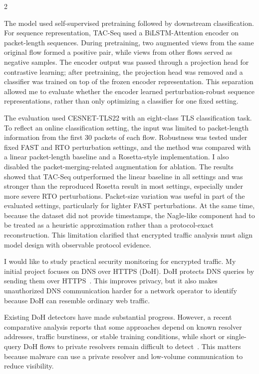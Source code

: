 \documentclass[a4paper,11pt]{article}
\newcommand{\majorsection}[1]{%
  \vspace{2pt}\noindent{\large\bfseries\color{DeepBlue} #1}\par\vspace{1pt}}
\newcommand{\subsectionrunin}[1]{%
  \vspace{1pt}\noindent{\bfseries\color{DeepBlue} #1}\par\nobreak\vspace{0pt}}
\begin{document}
\begin{multicols}{2}

The model used self-supervised pretraining followed by downstream
classification. For sequence representation, TAC-Seq used a BiLSTM-Attention
encoder on packet-length sequences. During pretraining, two augmented views
from the same original flow formed a positive pair, while views from other
flows served as negative samples. The encoder output was passed through a
projection head for contrastive learning; after
pretraining, the projection head was removed and a classifier was trained on
top of the frozen encoder representation. This separation allowed me to
evaluate whether the encoder learned perturbation-robust sequence
representations, rather than only optimizing a classifier for one fixed setting.

The evaluation used CESNET-TLS22 with an eight-class TLS classification task.
To reflect an online classification setting, the input was
limited to packet-length information from the first 30 packets of each flow.
Robustness was tested under fixed FAST and RTO perturbation settings, and the
method was compared with a linear packet-length baseline and a Rosetta-style
implementation. I also disabled the packet-merging-related augmentation for
ablation. The results showed that TAC-Seq outperformed the linear baseline in
all settings and was stronger than the reproduced
Rosetta result in most settings, especially under more severe RTO
perturbations. Packet-size variation was useful in part of the evaluated
settings, particularly for lighter FAST perturbations. At the same time,
because the dataset did not provide timestamps, the Nagle-like component had
to be treated as a heuristic approximation rather than a protocol-exact
reconstruction. This limitation clarified that encrypted traffic analysis must
align model design with observable protocol evidence.

\majorsection{2. 取り組みたい内容}

\subsectionrunin{2.1 Background and problem.}
I would like to study practical security monitoring for encrypted traffic.
My initial project focuses on DNS over HTTPS (DoH). DoH protects DNS queries
by sending them over HTTPS~\cite{rfc8484}. This improves privacy, but it also
makes unauthorized DNS communication harder for a network operator to
identify because DoH can resemble ordinary web traffic.

Existing DoH detectors have made substantial progress. However, a recent
comparative analysis reports that some approaches depend on known resolver
addresses, traffic burstiness, or stable training conditions, while short or
single-query DoH flows to private resolvers remain difficult to
detect~\cite{jerabek2024}. This matters because malware can use a private
resolver and low-volume communication to reduce visibility.


\end{multicols}
\end{document}
